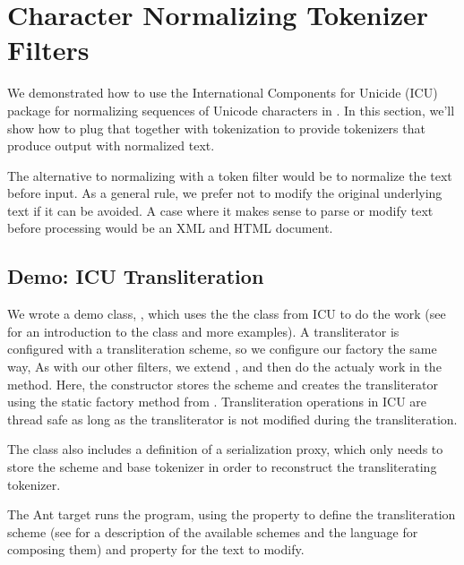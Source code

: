 \section{Character Normalizing Tokenizer Filters}

We demonstrated how to use the International Components for Unicide
(ICU) package for normalizing sequences of Unicode characters in
.  In this section, we'll show how
to plug that together with tokenization to provide tokenizers that
produce output with normalized text.  

The alternative to normalizing with a token filter would be to
normalize the text before input.  As a general rule, we prefer not to
modify the original underlying text if it can be avoided.  A case
where it makes sense to parse or modify text before processing would
be an XML and HTML document.  

\subsection{Demo: ICU Transliteration}

We wrote a demo class, , which
uses the the  class from ICU to do the work (see
 for an introduction to the class and
more examples).  A transliterator is configured with a transliteration
scheme, so we configure our factory the same way,
%
%
As with our other filters, we extend
, and then do the actualy work in
the  method.  Here, the constructor stores
the scheme and creates the transliterator using the static factory
method  from .
Transliteration operations in ICU are thread safe as long as the
transliterator is not modified during the transliteration.

The class also includes a definition of a serialization proxy,
which only needs to store the scheme and base tokenizer in order
to reconstruct the transliterating tokenizer.

The Ant target  runs the program,
using the property  to define the
transliteration scheme (see  for
a description of the available schemes and the language for
composing them) and property  for the text to modify.
%
\commandlinefollow{}
\begin{verbatim}

\end{verbatim}

